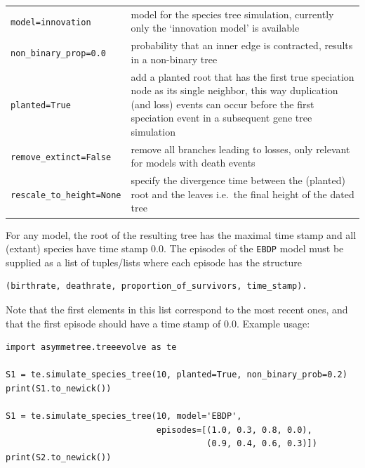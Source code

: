 \documentclass[hidelinks,11pt]{article}
\newcommand{\sq}{\textquotesingle}
\begin{document}
\vspace{3mm}
{\small\centering
\begin{longtable}{ p{3.5cm} p{10cm} }
	\texttt{model=\sq innovation\sq}  & model for the species tree simulation,
	currently only the `innovation model' is available\\
	\texttt{non\_binary\_prop=0.0} & probability that an inner edge is contracted,
	results in a non-binary tree\\
	\texttt{planted=True} & add a planted root that has the first true speciation node as its
	single neighbor, this way duplication (and loss) events can occur before the first speciation event in a subsequent gene tree simulation\\
	\texttt{remove\_extinct=\newline False} & remove all branches leading to losses, only relevant for models with death events\\
	\texttt{rescale\_to\_height=\newline None} & specify the divergence time between the (planted) root and the leaves i.e.\ the final height of the dated tree\\
\end{longtable}
}
\vspace{3mm}

For any model, the root of the resulting tree has the maximal time stamp and all (extant) species have time stamp 0.0.
The episodes of the \texttt{\sq EBDP\sq} model must be supplied as a list of
tuples/lists where each episode has the structure

\begin{adjustwidth}{1cm}{1cm}\vspace{2mm}
\begin{verbatim}
(birthrate, deathrate, proportion_of_survivors, time_stamp).
\end{verbatim}
\end{adjustwidth}

\noindent
Note that the first elements in this list correspond to the most recent ones, and that the first episode should have a time stamp of 0.0.
Example usage:

\begin{adjustwidth}{1cm}{1cm}\vspace{2mm}
\begin{verbatim}
import asymmetree.treeevolve as te

S1 = te.simulate_species_tree(10, planted=True, non_binary_prob=0.2)
print(S1.to_newick())

S1 = te.simulate_species_tree(10, model='EBDP',
                              episodes=[(1.0, 0.3, 0.8, 0.0),
                                        (0.9, 0.4, 0.6, 0.3)])
print(S2.to_newick())
\end{verbatim}
\end{adjustwidth}
\end{document}

